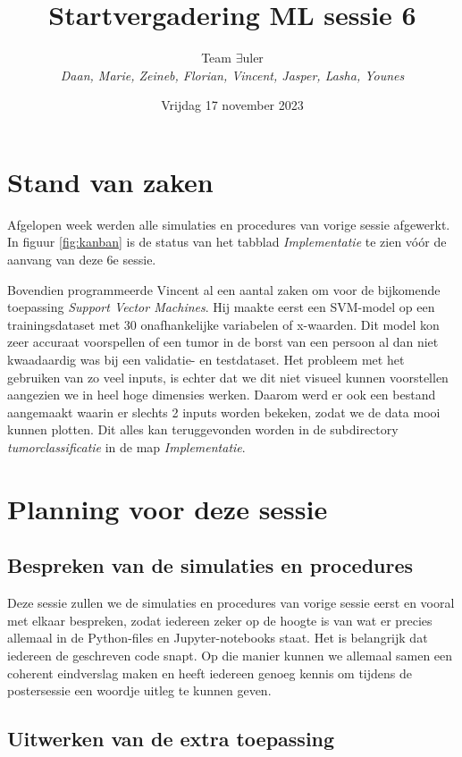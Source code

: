 \documentclass{article}
\title{Startvergadering ML sessie 6}
\author{Team $\exists$uler\\
	\textit{Daan, Marie, Zeineb, Florian, Vincent, Jasper, Lasha, Younes}}
\date{Vrijdag 17 november 2023}
\begin{document}
	
	\maketitle
	
	\section*{Stand van zaken}
	
	Afgelopen week werden alle simulaties en procedures van vorige sessie afgewerkt. In figuur \ref{fig:kanban} is de status van het tabblad \textit{Implementatie} te zien vóór de aanvang van deze 6e sessie.
	
	Bovendien programmeerde Vincent al een aantal zaken om voor de bijkomende toepassing \textit{Support Vector Machines}. Hij maakte eerst een SVM-model op een trainingsdataset met 30 onafhankelijke variabelen of x-waarden. Dit model kon zeer accuraat voorspellen of een tumor in de borst van een persoon al dan niet kwaadaardig was bij een validatie- en testdataset. Het probleem met het gebruiken van zo veel inputs, is echter dat we dit niet visueel kunnen voorstellen aangezien we in heel hoge dimensies werken. Daarom werd er ook een bestand aangemaakt waarin er slechts 2 inputs worden bekeken, zodat we de data mooi kunnen plotten. Dit alles kan teruggevonden worden in de subdirectory \textit{tumorclassificatie} in de map \textit{Implementatie}.
	
	\section*{Planning voor deze sessie}
	
	\subsection*{Bespreken van de simulaties en procedures}
	
	Deze sessie zullen we de simulaties en procedures van vorige sessie eerst en vooral met elkaar bespreken, zodat iedereen zeker op de hoogte is van wat er precies allemaal in de Python-files en Jupyter-notebooks staat. Het is belangrijk dat iedereen de geschreven code snapt. Op die manier kunnen we allemaal samen een coherent eindverslag maken en heeft iedereen genoeg kennis om tijdens de postersessie een woordje uitleg te kunnen geven.
	
	\subsection*{Uitwerken van de extra toepassing}
	
\end{document}
